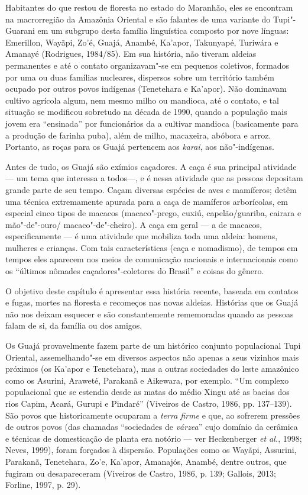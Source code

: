 Habitantes do que restou de floresta no estado do Maranhão, eles se
encontram na macrorregião da Amazônia Oriental e são falantes de uma
variante do Tupi"-Guarani em um subgrupo desta família linguística
composto por nove línguas: Emerillon, Wayãpi, Zo'é, Guajá, Anambé,
Ka'apor, Takunyapé, Turiwára e Amanayé (Rodrigues, 1984/85). Em sua
história, não tiveram aldeias permanentes e até o contato organizavam"-se
em pequenos coletivos, formados por uma ou duas famílias nucleares,
dispersos sobre um território também ocupado por outros povos indígenas
(Tenetehara e Ka'apor). Não dominavam cultivo agrícola algum, nem mesmo
milho ou mandioca, até o contato, e tal situação se modificou sobretudo
na década de 1990, quando a população mais jovem era ``ensinada''
por funcionários da  a cultivar mandioca (basicamente para a
produção de farinha puba), além de milho, macaxeira, abóbora e arroz.
Portanto, as roças para os Guajá pertencem aos \emph{karai}, aos
não"-indígenas.

Antes de tudo, os Guajá são exímios caçadores. A caça é sua principal
atividade --- um tema que interessa a todos---, e é nessa atividade que as
pessoas depositam grande parte de seu tempo. Caçam diversas espécies de
aves e mamíferos; detêm uma técnica extremamente apurada para a caça de
mamíferos arborícolas, em especial cinco tipos de macacos (macaco"-prego,
cuxiú, capelão/guariba, cairara e mão"-de"-ouro/
macaco"-de"-cheiro). A caça em geral --- a de macacos, especificamente --- é
uma atividade que mobiliza toda uma aldeia: homens, mulheres e crianças.
Com tais características (caça e nomadismo), de tempos em tempos eles
aparecem nos meios de comunicação nacionais e internacionais como os
``últimos nômades caçadores"-coletores do Brasil'' e coisas do gênero.

O objetivo deste capítulo é apresentar essa história recente, baseada em
contatos e fugas, mortes na floresta e recomeços nas novas aldeias.
Histórias que os Guajá não nos deixam esquecer e são constantemente
rememoradas quando as pessoas falam de si, da família ou dos amigos.

Os Guajá provavelmente fazem parte de um histórico conjunto populacional
Tupi Oriental, assemelhando"-se em diversos aspectos não apenas a seus
vizinhos mais próximos (os Ka'apor e Tenetehara), mas a outras
sociedades do leste amazônico como os Asurini, Araweté, Parakanã e
Aikewara, por exemplo. ``Um complexo populacional que se estendia desde
as matas do médio Xingu até as bacias dos rios Capim, Acará, Gurupi e
Pindaré'' (Viveiros de Castro, 1986, pp. 137--139). São povos que
historicamente ocuparam a \emph{terra firme} e que, ao sofrerem pressões
de outros povos (das chamadas ``sociedades de \emph{várzea}'' cujo
domínio da cerâmica e técnicas de domesticação de planta era notório ---
ver Heckenberger \emph{et al.}, 1998; Neves, 1999), foram forçados à dispersão.
Populações como os Wayãpi, Assurini, Parakanã, Tenetehara, Zo'e,
Ka'apor, Amanajós, Anambé, dentre outros, que fugiram ou desapareceram
(Viveiros de Castro, 1986, p. 139; Gallois, 2013; Forline, 1997, p. 29).

